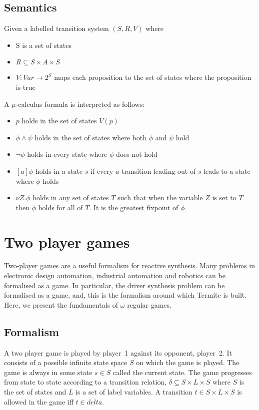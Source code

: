 \documentclass[a4paper,twoside,openright,11pt]{book}
\theoremstyle{definition}
\begin{document}
\subsection{Semantics}

Given a labelled transition system $(S, R, V)$ where
\begin{itemize}
    \item S is a set of states
    \item $R \subseteq S \times A \times S$
    \item $V : Var \rightarrow 2^S$ maps each proposition to the set of states where the proposition is true
\end{itemize}

A $\mu$-calculus formula is interpreted as follows:
\begin{itemize}
    \item $p$ holds in the set of states $V(p)$
    \item $\phi \wedge \psi$ holds in the set of states where both $\phi$ and $\psi$ hold
    \item $\neg \phi$ holds in every state where $\phi$ does not hold 
    \item $[a]\phi$ holds in a state $s$ if every $a$-transition leading out of $s$ leads to a state where $\phi$ holds
    \item $\nu Z. \phi$ holds in any set of states $T$ such that when the variable $Z$ is set to $T$ then $\phi$ holds for all of $T$. It is the greatest fixpoint of $\phi$.
\end{itemize}

\section{Two player games}

Two-player games are a useful formalism for reactive synthesis. Many problems in electronic design automation, industrial automation and robotics can be formalised as a game. In particular, the driver synthesis problem can be formalised as a game, and, this is the formalism around which Termite is built. Here, we present the fundamentals of $\omega$ regular games. 

\subsection{Formalism}

A two player game is played by player~1 against its opponent, player~2. It consists of a possible infinite state space $S$ on which the game is played. The game is always in some state $s \in S$ called the current state. The game progresses from state to state according to a transition relation, $\delta \subseteq S \times L \times S$ where $S$ is the set of states and $L$ is a set of label variables. A transition $t \in S \times L \times S$ is allowed in the game iff $t \in delta$. 
\end{document}

